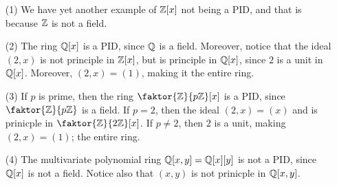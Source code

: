 \begin{example}\label{example_3.3}
    \begin{enumerate}
        \item[(1)] We have yet another example of $\mathbb{Z}[x]$ not being a PID, and
            that is because $\mathbb{Z}$ is not a field.

        \item[(2)] The ring $\mathbb{Q}[x]$ is a PID, since $\mathbb{Q}$ is a field. Moreover,
            notice that the ideal  $(2,x)$ is not principle in $\mathbb{Z}[x]$, but is
            principle in $\mathbb{Q}[x]$, since $2$ is a unit in  $\mathbb{Q}[x]$. Moreover,
            $(2,x)=(1)$, making it the entire ring.

        \item[(3)] If $p$ is prime, then the ring  $\faktor{\Z}{p\Z}[x]$ is a
            PID, since $\faktor{\Z}{p\Z}$ is a field. If $p=2$, then the ideal
            $(2,x)=(x)$ and is prinicple in $\faktor{\Z}{2\Z}[x]$. If $p \neq 2$,
            then  $2$ is a unit, making  $(2,x)=(1)$; the entire ring.

        \item[(4)] The multivariate polynomial ring $\mathbb{Q}[x,y]=\mathbb{Q}[x][y]$ is not a
            PID, since $\mathbb{Q}[x]$ is not a field. Notice also that $(x,y)$ is not
            prinicple in $\mathbb{Q}[x,y]$.
    \end{enumerate}
\end{example}
